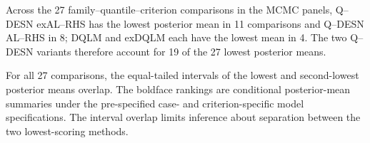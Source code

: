 Across the 27 family--quantile--criterion comparisons in the MCMC panels, Q--DESN exAL--RHS has the lowest posterior mean in 11 comparisons and Q--DESN AL--RHS in 8; DQLM and exDQLM each have the lowest mean in 4. The two Q--DESN variants therefore account for 19 of the 27 lowest posterior means.

For all 27 comparisons, the equal-tailed intervals of the lowest and second-lowest posterior means overlap. The boldface rankings are conditional posterior-mean summaries under the pre-specified case- and criterion-specific model specifications. The interval overlap limits inference about separation between the two lowest-scoring methods.
